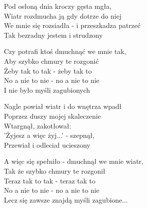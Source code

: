 \begin{text}
    Pod osłoną dnia kroczy gęsta mgła,\\
    Wiatr rozdmucha ją gdy dotrze do niej\\
    We mnie się rozsiadła - i przeszkadza patrzeć\\
    Tak bezradny jestem i strudzony

    Czy potrafi ktoś dmuchnąć we mnie tak,\\
    Aby szybko chmury te rozgonić\\
    Żeby tak to tak - żeby tak to\\
    No a nie to nie - no a nie to nie\\
    I nie było myśli zagubionych

    Nagle powiał wiatr i do wnętrza wpadł\\
    Poprzez duszy mojej skaleczenie\\
    Wtargnął, zakotłował:\\
    'Żyjesz a więc żyj...' - szepnął,\\
    Przewiał i odleciał ucieszony

    A więc się spełniło - dmuchnął we mnie wiatr,\\
    Tak że szybko chmury te rozgonił\\
    Teraz tak to tak - teraz tak to\\
    No a nie to nie - no a nie to nie\\
    Lecz się zawsze znajdą myśli zagubione...
\end{text}
\begin{chord}

\end{chord}